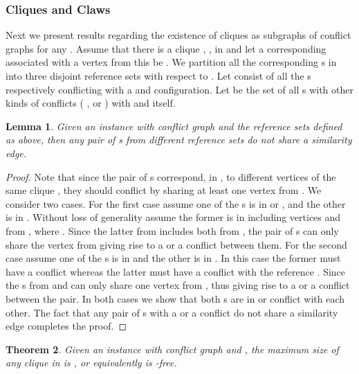 \documentclass[final]{dmtcs-episciences}
\newtheorem{theorem}{Theorem}
\newtheorem{lemma}[theorem]{Lemma}
\begin{document}
\subsubsection{Cliques and Claws}\label{subsub:cc}

Next we present results regarding the existence of cliques as subgraphs of conflict graphs
for any .
Assume that there is a clique , , in  and let a corresponding  associated with a vertex  from this  be .
We partition all the corresponding s in  into three disjoint reference sets with respect to .
Let  consist of all the s respectively conflicting  with a   and  configuration. 
Let  be the set of all s 
with other kinds of conflicts ( ,  or ) with  and  itself.  

\begin{lemma}
\label{lem_edgesharing}
Given an instance  with conflict graph  and the reference sets defined as above, then any pair of s from different reference sets do not share a similarity edge.
\end{lemma}
\begin{proof}
Note that since the pair of s correspond, in , to different vertices of the same clique , they should conflict
by sharing at least one vertex from . 
We consider two cases. For the first case assume one of the s is in  or , and the other is in .
Without loss of generality assume the former  is in  including vertices  and  from , where .
Since the latter  from  includes both  from , the pair of s can only share the vertex  from 
 giving rise to a  or a  conflict between them. 
For the second case assume one of the s is in  and 
the other is in . In this case the former must have a  conflict whereas
the latter must have a  conflict with the reference . Since  
the s from  and  can only share one vertex from , thus giving rise to a  or a  conflict between the pair. 
In both cases we show that both s are in  or  conflict with each other. 
The fact that any pair of s with a  or a  conflict do not share a similarity edge
completes the proof.
\end{proof}


 
\begin{theorem}
\label{lem_clique}
Given an instance  with conflict graph  and , the maximum size of any clique in  is 
, or equivalently  is -free.
\end{theorem}
\end{document}
